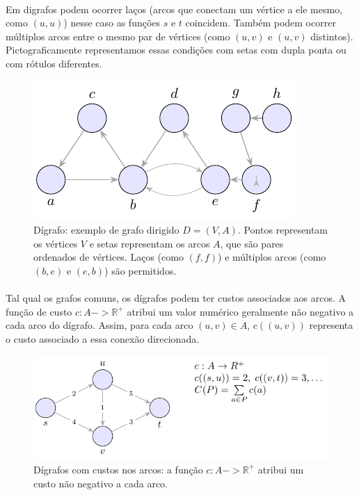 \documentclass[12pt,a4paper]{article}
\def\to{->}%
\begin{document}
\paragraph{}
Em digrafos podem ocorrer laços (arcos que conectam um vértice a ele mesmo, como \((u, u)\)) nesse caso as funções \(s\) e \(t\) coincidem. Também podem ocorrer múltiplos arcos entre o mesmo par de vértices (como \((u, v)\) e \((u, v)\) distintos). Pictograficamente representamos essas condições com setas com dupla ponta ou com rótulos diferentes.


\begin{figure}[H]
    \centering
    \includegraphics[width=0.9\linewidth]{figures/fig_def_digrafo_simples.pdf}

    \caption{Dígrafo: exemplo de grafo dirigido \(D=(V,A)\). Pontos representam os vértices \(V\) e setas representam os arcos \(A\), que são pares ordenados de vértices. Laços (como \((f,f)\)) e múltiplos arcos (como \((b,e)\) e \((e,b)\)) são permitidos.}
    \label{fig:def-digrafo-simples}\end{figure}
       

\paragraph{}
Tal qual os grafos comuns, os dígrafos podem ter custos associados aos arcos. A função de custo \(c: A \to \mathbb{R}^+\) atribui um valor numérico geralmente não negativo a cada arco do dígrafo. Assim, para cada arco \((u, v) \in A\), \(c((u, v))\) representa o custo associado a essa conexão direcionada.


\begin{figure}[H]
    \centering
    \includegraphics[width=0.9\linewidth]{figures/fig_digrafo_custos.pdf}

    \caption{Dígrafos com custos nos arcos: a função $c:A\to\mathbb{R}^+$ atribui um custo não negativo a cada arco.}
    \label{fig:digrafo-custos}
    \end{figure}
\end{document}
